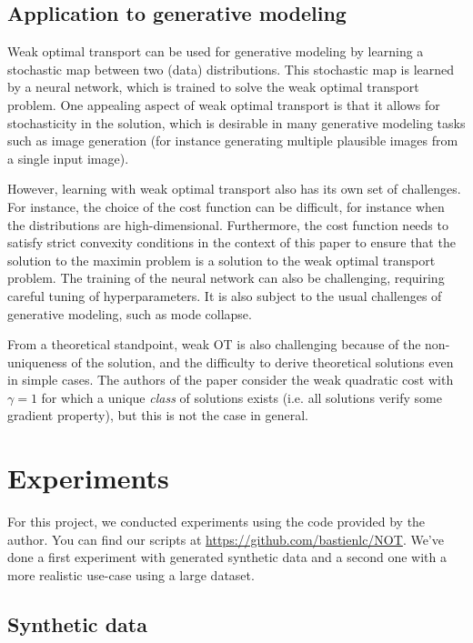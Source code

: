 \documentclass[11pt]{article}
\begin{document}
\subsection{Application to generative modeling}

Weak optimal transport can be used for generative modeling by learning a stochastic map between two (data) distributions. This stochastic map is learned by a neural network, which is trained to solve the weak optimal transport problem. One appealing aspect of weak optimal transport is that it allows for stochasticity in the solution, which is desirable in many generative modeling tasks such as image generation (for instance generating multiple plausible images from a single input image).

However, learning with weak optimal transport also has its own set of challenges. For instance, the choice of the cost function can be difficult, for instance when the distributions are high-dimensional. Furthermore, the cost function needs to satisfy strict convexity conditions in the context of this paper to ensure that the solution to the maximin problem is a solution to the weak optimal transport problem. The training of the neural network can also be challenging, requiring careful tuning of hyperparameters. It is also subject to the usual challenges of generative modeling, such as mode collapse.

From a theoretical standpoint, weak OT is also challenging because of the non-uniqueness of the solution, and the difficulty to derive theoretical solutions even in simple cases. The authors of the paper consider the weak quadratic cost with $\gamma=1$ for which a unique \textit{class} of solutions exists (i.e. all solutions verify some gradient property), but this is not the case in general.

\section{Experiments}

For this project, we conducted experiments using the code provided by the author. You can find our scripts at \href{https://github.com/bastienlc/NOT}{https://github.com/bastienlc/NOT}. We've done a first experiment with generated synthetic data and a second one with a more realistic use-case using a large dataset.

\subsection{Synthetic data}
\end{document}
